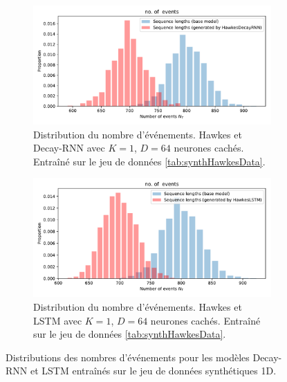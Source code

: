\documentclass[../main.tex]{subfiles}
\begin{document}
\begin{figure}[ht]
	\begin{subfigure}{\linewidth}
		\includegraphics[width=\linewidth]{../results/length_distrib_HawkesDecayRNN-1d-hidden_64-20181206-234848.pdf}
		\caption{Distribution du nombre d'événements. Hawkes et Decay-RNN avec $K=1$, $D=64$ neurones cachés. Entraîné sur le jeu de données \autoref{tab:synthHawkesData}.}\label{fig:1DRNNlengthDistrib}
	\end{subfigure}
	\begin{subfigure}{\linewidth}
		\includegraphics[width=\linewidth]{../results/length_distrib_HawkesLSTM-1d-hidden64-20181206-235311.pdf}
		\caption{Distribution du nombre d'événements. Hawkes et LSTM avec $K=1$, $D=64$ neurones cachés. Entraîné sur le jeu de données \autoref{tab:synthHawkesData}.}\label{fig:1DLSTMlengthDistrib}	
	\end{subfigure}
	\caption{Distributions des nombres d'événements pour les modèles Decay-RNN et LSTM entraînés sur le jeu de données synthétiques 1D.}\label{fig:1DlengthDistrib}
\end{figure}
\end{document}
